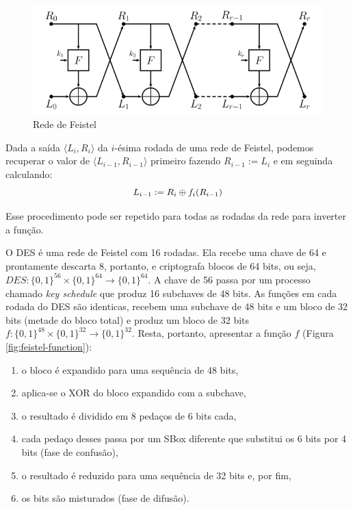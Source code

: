 \begin{figure}[htbp]
  \centering
  \includegraphics[width=.8\textwidth]{imagens/feistel.png}
  \caption{Rede de Feistel}
  \label{fig:feistel}
\end{figure}



Dada a saída $\langle L_i, R_i \rangle$ da $i$-ésima rodada de uma rede de Feistel, podemos recuperar o valor de $\langle L_{i-1}, R_{i-1} \rangle$ primeiro fazendo $R_{i-1} := L_i$ e em seguinda calculando:
\begin{displaymath}
  L_{i-1} := R_i \oplus f_i(R_{i-1})
\end{displaymath}

Esse procedimento pode ser repetido para todas as rodadas da rede para inverter a função.

O DES é uma rede de Feistel com 16 rodadas.
Ela recebe uma chave de 64 e prontamente descarta 8, portanto, e criptografa blocos de 64 bits, ou seja, $DES: \{0,1\}^{56} \times \{0,1\}^{64} \to \{0,1\}^{64}$.
A chave de 56 passa por um processo chamado {\em key schedule} que produz 16 subchaves de 48 bits.
As funções em cada rodada do DES são identicas, recebem uma subchave de 48 bits e um bloco de 32 bits (metade do bloco total) e produz um bloco de 32 bits $f: \{0,1\}^{48} \times \{0,1\}^{32} \to \{0,1\}^{32}$.
Resta, portanto, apresentar a função $f$ (Figura \ref{fig:feistel-function}):
\begin{enumerate}
\item o bloco é expandido para uma sequência de 48 bits,
\item aplica-se o XOR do bloco expandido com a subchave,
\item o resultado é dividido em 8 pedaços de 6 bits cada,
\item cada pedaço desses passa por um SBox diferente que substitui os 6 bits por 4 bits (fase de confusão),
\item o resultado é reduzido para uma sequência de 32 bits e, por fim,
\item os bits são misturados (fase de difusão).
\end{enumerate}

